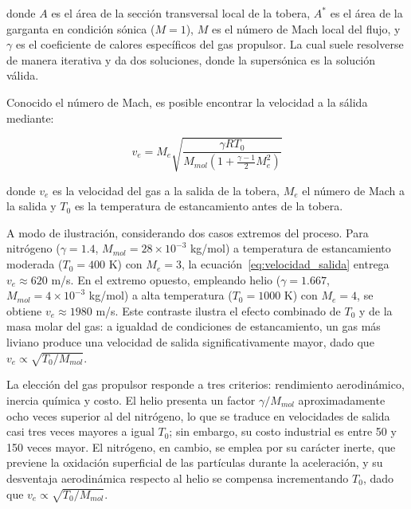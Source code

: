 donde \( A \) es el área de la sección transversal local de la tobera, \( A^* \) es el área de la garganta en condición sónica (\( M = 1 \)), \( M \) es el número de Mach local del flujo, y \( \gamma \) es el coeficiente de calores específicos 
del gas propulsor. La cual suele resolverse de manera iterativa y da dos soluciones, donde la supersónica es la solución válida. 

Conocido el número de Mach, es posible encontrar la velocidad a la sálida mediante:

\begin{equation}
	v_e = M_{e} \sqrt{\frac{\gamma R T_0}{M_{mol}\left(1 + \frac{\gamma-1}{2}M_{e}^2\right)}}
	\label{eq:velocidad_salida}
\end{equation}

donde \( v_e \) es la velocidad del gas a la salida de la tobera, $M_{e}$ el número de Mach a la salida y \( T_0 \) es la temperatura de estancamiento antes de la tobera.

A modo de ilustración, considerando dos casos extremos del proceso.
Para nitrógeno (\( \gamma = 1.4 \), \( M_{mol} = 28\times10^{-3} \) 
kg/mol) a temperatura de estancamiento moderada (\( T_0 = 400 \) K) 
con \( M_e = 3 \), la ecuación~\ref{eq:velocidad_salida} entrega 
\( v_e \approx 620 \) m/s. En el extremo opuesto, empleando helio 
(\( \gamma = 1.667 \), \( M_{mol} = 4\times10^{-3} \) kg/mol) a alta 
temperatura (\( T_0 = 1000 \) K) con \( M_e = 4 \), se obtiene 
\( v_e \approx 1980 \) m/s. Este contraste ilustra el efecto combinado 
de \( T_0 \) y de la masa molar del gas: a igualdad de condiciones 
de estancamiento, un gas más liviano produce una velocidad de salida 
significativamente mayor, dado que \( v_e \propto \sqrt{T_0/M_{mol}} \).

La elección del gas propulsor responde a tres criterios: rendimiento 
aerodinámico, inercia química y costo. El helio presenta un factor 
$\gamma/M_{mol}$ aproximadamente ocho veces superior al del nitrógeno, 
lo que se traduce en velocidades de salida casi tres veces mayores a 
igual $T_0$; sin embargo, su costo industrial es entre 50 y 150 veces 
mayor\cite{Champagne2016unique}. El nitrógeno, en cambio, se emplea 
por su carácter inerte, que previene la oxidación superficial de las 
partículas durante la aceleración, y su desventaja aerodinámica 
respecto al helio se compensa incrementando $T_0$, dado que 
$v_e \propto \sqrt{T_0/M_{mol}}$\cite{Huang2020}.


